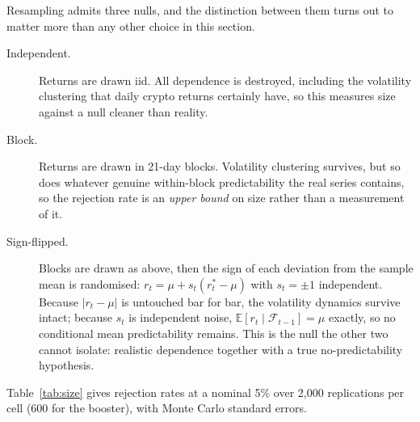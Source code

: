 \documentclass{article}
\theoremstyle{plain}
\theoremstyle{definition}
\begin{document}
Resampling admits three nulls, and the distinction between them turns out to matter
more than any other choice in this section.

\begin{description}
  \item[Independent.] Returns are drawn iid. All dependence is destroyed, including
    the volatility clustering that daily crypto returns certainly have, so this
    measures size against a null cleaner than reality.
  \item[Block.] Returns are drawn in 21-day blocks. Volatility clustering survives,
    but so does whatever genuine within-block predictability the real series
    contains, so the rejection rate is an \emph{upper bound} on size rather than a
    measurement of it.
  \item[Sign-flipped.] Blocks are drawn as above, then the sign of each deviation
    from the sample mean is randomised: $r_t = \mu + s_t (r^{\ast}_t - \mu)$ with
    $s_t = \pm 1$ independent. Because $|r_t - \mu|$ is untouched bar for bar, the
    volatility dynamics survive intact; because $s_t$ is independent noise,
    $\mathbb{E}[r_t \mid \mathcal{F}_{t-1}] = \mu$ exactly, so no conditional mean
    predictability remains. This is the null the other two cannot isolate: realistic
    dependence together with a true no-predictability hypothesis.
\end{description}

Table~\ref{tab:size} gives rejection rates at a nominal 5\% over 2{,}000
replications per cell (600 for the booster), with Monte Carlo standard errors.
\end{document}
